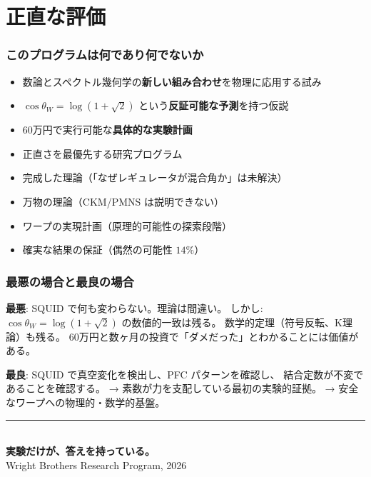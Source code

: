 \documentclass[12pt,a4paper]{article}
\begin{document}
\part{正直な評価}

\section{このプログラムは何であり何でないか}

\begin{honestbox}[何であるか]
\begin{itemize}
\item 数論とスペクトル幾何学の\textbf{新しい組み合わせ}を物理に応用する試み
\item $\cos\theta_W = \log(1+\sqrt{2})$ という\textbf{反証可能な予測}を持つ仮説
\item 60万円で実行可能な\textbf{具体的な実験計画}
\item 正直さを最優先する研究プログラム
\end{itemize}
\end{honestbox}

\begin{honestbox}[何でないか]
\begin{itemize}
\item 完成した理論（「なぜレギュレータが混合角か」は未解決）
\item 万物の理論（CKM/PMNS は説明できない）
\item ワープの実現計画（原理的可能性の探索段階）
\item 確実な結果の保証（偶然の可能性 $14\%$）
\end{itemize}
\end{honestbox}

\section{最悪の場合と最良の場合}

\textbf{最悪}: SQUID で何も変わらない。理論は間違い。
しかし: $\cos\theta_W = \log(1+\sqrt{2})$ の数値的一致は残る。
数学的定理（符号反転、K理論）も残る。
60万円と数ヶ月の投資で「ダメだった」とわかることには価値がある。

\textbf{最良}: SQUID で真空変化を検出し、PFC パターンを確認し、
結合定数が不変であることを確認する。
→ 素数が力を支配している最初の実験的証拠。
→ 安全なワープへの物理的・数学的基盤。

\vfill

\begin{center}
\rule{10cm}{0.4pt}\\[0.5cm]
{\Large\bfseries 実験だけが、答えを持っている。}\\[0.3cm]
{\small Wright Brothers Research Program, 2026}
\end{center}
\end{document}
